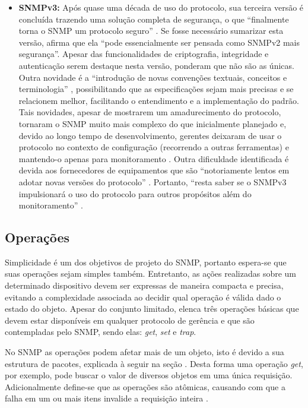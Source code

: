\documentclass[twoside,english,brazilian]{UNISINOSmonografia}
\begin{document}
\begin{itemize}
\item \textbf{SNMPv3:}
Após quase uma década de uso do protocolo, sua terceira versão é concluída 
trazendo uma solução completa de segurança, o que ``finalmente torna o SNMP um 
protocolo seguro'' \cite{Clemm2006}.
Se fosse necessário sumarizar esta versão,  afirma que 
ela ``pode essencialmente ser pensada como SNMPv2 mais segurança''.
Apesar das funcionalidades de criptografia, integridade e autenticação serem 
destaque nesta versão,  ponderam que não são as únicas.
Outra novidade é a ``introdução de novas convenções textuais, conceitos e 
terminologia'' \cite{Mauro2009}, possibilitando que as especificações sejam 
mais precisas e se relacionem melhor, facilitando o entendimento e 
a implementação do padrão.
Tais novidades, apesar de mostrarem um amadurecimento do protocolo, tornaram o 
SNMP muito mais complexo do que inicialmente planejado e, devido ao longo 
tempo de desenvolvimento, gerentes deixaram de usar o protocolo no contexto de 
configuração (recorrendo a outras ferramentas) e mantendo-o apenas para 
monitoramento \cite{Clemm2006}.
Outra dificuldade identificada é devida aos fornecedores de equipamentos que 
são ``notoriamente lentos em adotar novas versões do protocolo'' 
\cite{Ding2009}.
Portanto, ``resta saber se o SNMPv3 impulsionará o uso do protocolo para 
outros propósitos além do monitoramento'' \cite{Clemm2006}.

\end{itemize}

\subsection{Operações}

Simplicidade é um dos objetivos de projeto do SNMP, portanto espera-se que
suas operações sejam simples também.
Entretanto, as ações realizadas sobre um determinado dispositivo devem ser 
expressas de maneira compacta e precisa, evitando a complexidade associada ao 
decidir qual operação é válida dado o estado do objeto.
Apesar do conjunto limitado,  elenca três 
operações básicas que devem estar disponíveis em qualquer protocolo de 
gerência e que são contempladas pelo SNMP, sendo elas: 
\textit{get}, \textit{set} e \textit{trap}.

No SNMP as operações podem afetar mais de um objeto, isto é devido a sua 
estrutura de pacotes, explicada à seguir na seção .
Desta forma uma operação \textit{get}, por exemplo, pode buscar o valor de 
diversos objetos em uma única requisição.
Adicionalmente define-se que as operações são atômicas, causando com que a 
falha em um ou mais itens invalide a requisição inteira \cite{Simoneau1999}.
\end{document}
